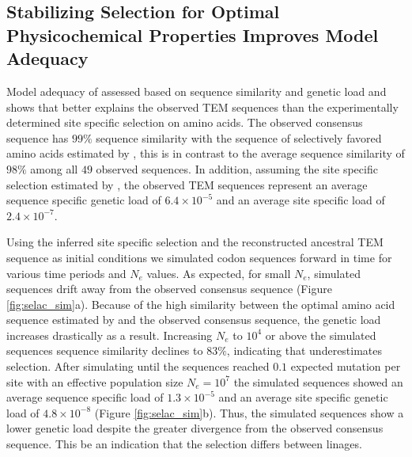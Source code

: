 \subsection{Stabilizing Selection for Optimal Physicochemical Properties Improves Model Adequacy} 
Model adequacy of \selac assessed based on sequence similarity and genetic load and shows that \selac better explains the observed TEM sequences than the experimentally determined site specific selection on amino acids.
The observed consensus sequence has $99 \%$ sequence similarity with the sequence of selectively favored amino acids estimated by \selac, this is in contrast to the average sequence similarity of $98 \%$ among all $49$ observed sequences.
In addition, assuming the site specific selection estimated by \selac, the observed TEM sequences represent an average sequence specific genetic load of $6.4\times10^{-5}$ and an average site specific load of $2.4\times10^{-7}$.

Using the \selac inferred site specific selection and the reconstructed ancestral TEM sequence as initial conditions we simulated codon sequences forward in time for various time periods and $N_e$ values.
As expected, for small $N_e$, simulated sequences drift away from the observed consensus sequence (Figure \ref{fig:selac_sim}a). 
Because of the high similarity between the optimal amino acid sequence estimated by \selac and the observed consensus sequence, the genetic load increases drastically as a result.
Increasing $N_e$ to $10^4$ or above the simulated sequences sequence similarity declines to $83 \%$, indicating that \selac underestimates selection.
After simulating until the sequences reached $0.1$ expected mutation per site with an effective population size $N_e = 10^7$ the simulated sequences showed an average sequence specific load of $1.3\times10^{-5}$ and an average site specific genetic load of $4.8\times10^{-8}$ (Figure \ref{fig:selac_sim}b).
Thus, the simulated sequences show a lower genetic load despite the greater divergence from the observed consensus sequence.
This be an indication that the selection differs between linages.


